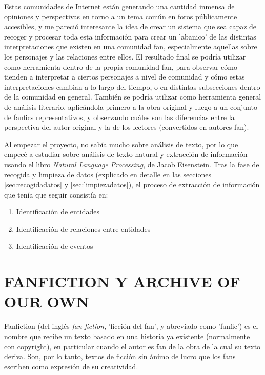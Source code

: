 \documentclass{pre-tfg}
\begin{document}
Estas comunidades de Internet están generando una cantidad inmensa de opiniones y perspectivas en torno a un tema común en foros públicamente accesibles, y me pareció interesante la idea de crear un sistema que sea capaz de recoger y procesar toda esta información para crear un 'abanico' de las distintas interpretaciones que existen en una comunidad fan, especialmente aquellas sobre los personajes y las relaciones entre ellos. El resultado final se podría utilizar como herramienta dentro de la propia comunidad fan, para observar cómo tienden a interpretar a ciertos personajes a nivel de comunidad y cómo estas interpretaciones cambian a lo largo del tiempo, o en distintas subsecciones dentro de la comunidad en general. También se podría utilizar como herramienta general de análisis literario, aplicándola primero a la obra original y luego a un conjunto de fanfics representativos, y observando cuáles son las diferencias entre la perspectiva del autor original y la de los lectores (convertidos en autores fan).

Al empezar el proyecto, no sabía mucho sobre análisis de texto, por lo que empecé a estudiar sobre análisis de texto natural y extracción de información usando el libro \textit{Natural Language Processing}, de Jacob Eisenstein\cite{jacob}. Tras la fase de recogida y limpieza de datos (explicado en detalle en las secciones \ref{sec:recogidadatos} y \ref{sec:limpiezadatos}), el proceso de extracción de información que tenía que seguir consistía en:


\begin{enumerate}
	\item Identificación de entidades
	\item Identificación de relaciones entre entidades
	\item Identificación de eventos
\end{enumerate}



\cleardoublepage
\section{FANFICTION Y ARCHIVE OF OUR OWN}

Fanfiction (del inglés \textit{fan fiction}, 'ficción del fan', y abreviado como 'fanfic') es el nombre que recibe un texto basado en una historia ya existente (normalmente con copyright), en particular cuando el autor es fan de la obra de la cual su texto deriva. Son, por lo tanto, textos de ficción sin ánimo de lucro que los fans escriben como expresión de su creatividad.
\end{document}

